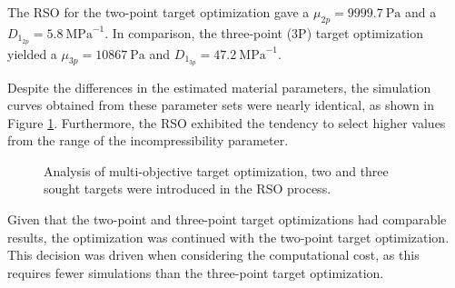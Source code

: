 The RSO for the two-point target optimization gave a $\mu_{2p}=\SI{9999.7}{\pascal}$ and a 
$D_{1_{2p}}=\SI{5.8}{\mega\pascal\tothe{-1}}$. In comparison, the three-point (3P) target optimization 
yielded a  $\mu_{3p}=\SI{10867}{\pascal}$ and $D_{1_{3p}}=\SI{47.2}{\mega\pascal\tothe{-1}}$.

Despite the differences in the estimated material parameters, the simulation curves obtained  
from these parameter sets were nearly identical, as shown in Figure \ref{fig:1vs2vs3points}.
Furthermore, the RSO exhibited the tendency to select higher values from the range of the 
incompressibility parameter.

\begin{figure}%
    \centering
   \quad
   \caption[Multi-objective optimization comparison]{Analysis of multi-objective target optimization, two and three sought targets were introduced in the RSO process. }%
   \label{fig:1vs2vs3points}%
\end{figure}

Given that the two-point and three-point target optimizations had comparable results, the optimization
was continued with the two-point target optimization. This decision was driven when considering 
the computational cost, as this requires fewer simulations than the three-point target optimization.

